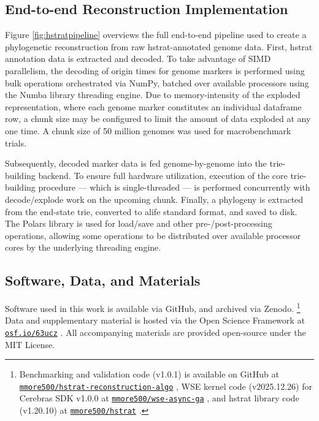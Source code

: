 \subsection{End-to-end Reconstruction Implementation}
\label{sec:pipeline}



Figure \ref{fig:hstratpipeline} overviews the full end-to-end pipeline used to create a phylogenetic reconstruction from raw hstrat-annotated genome data.
First, hstrat annotation data is extracted and decoded.
To take advantage of SIMD parallelism, the decoding of origin times for genome markers is performed using bulk operations orchestrated via NumPy, batched over available processors using the Numba library threading engine.
Due to memory-intensity of the exploded representation, where each genome marker constitutes an individual dataframe row, a chunk size may be configured to limit the amount of data exploded at any one time.
A chunk size of 50 million genomes was used for macrobenchmark trials.

Subsequently, decoded marker data is fed genome-by-genome into the trie-building backend.
To ensure full hardware utilization, execution of the core trie-building procedure --- which is single-threaded --- is performed concurrently with decode/explode work on the upcoming chunk.
Finally, a phylogeny is extracted from the end-state trie, converted to alife standard format, and saved to disk.
The Polars library is used for load/save and other pre-/post-processing operations, allowing some operations to be distributed over available processor cores by the underlying threading engine.

\subsection{Software, Data, and Materials} \label{sec:materials}

Software used in this work is available via GitHub, and archived via Zenodo.%
\footnote{\scriptsize Benchmarking and validation code (v1.0.1) is available on GitHub at \href{https://github.com/mmore500/hstrat-reconstruction-algo/tree/v1.0.1}{\texttt{mmore500/hstrat-reconstruction-algo}} \citep{matthew_andres_moreno_2025_16898918}, WSE kernel code (v2025.12.26) for Cerebras SDK v1.0.0 at \href{https://github.com/mmore500/wse-async-ga/tree/v2025.12.26}{\texttt{mmore500/wse-async-ga}} \citep{moreno_2025_16898904}, and hstrat library code (v1.20.10) at \href{https://github.com/mmore500/hstrat/tree/v1.20.10}{\texttt{mmore500/hstrat}} \citep{moreno_2025_16898849}.}
Data and supplementary material is hosted via the Open Science Framework at \href{https://osf.io/63ucz/?view_only=2e3ec335c016436494ad125b14ffc8cb}{\texttt{osf.io/63ucz}} \citep{supplemental,foster2017open}.
All accompanying materials are provided open-source under the MIT License.

